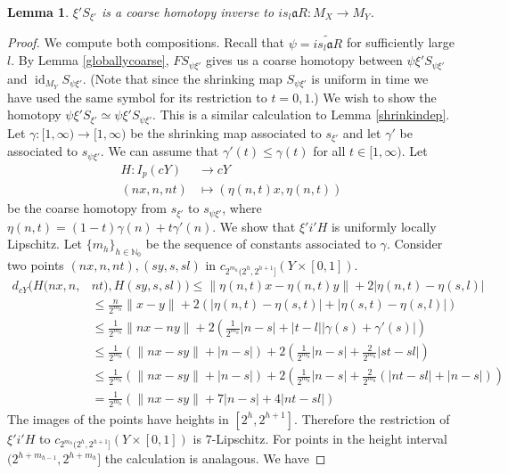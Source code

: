 \documentclass[a4paper,11pt]{article}
\theoremstyle{definition}
\theoremstyle{plain}
\newtheorem{lemma}[definition]{Lemma}
\theoremstyle{remark}
\DeclareMathOperator{\id}{id}
\begin{document}
{\begin{lemma} \label{che} $\xi' S_{\xi'}$ is a coarse homotopy inverse to $is_{l}\mathfrak{a}R: M_{X}\rightarrow M_{Y}$.  
\end{lemma}

\begin{proof} We compute both compositions. Recall that $\psi = \widetilde{is_{l}\mathfrak{a}R}$ for sufficiently large $l$. By Lemma \ref{globallycoarse}, $F S_{\psi \xi'}$ gives us a coarse homotopy between $\psi \xi' S_{\psi \xi'}$ and $\id_{M_{Y}}S_{\psi \xi'}$. (Note that since the shrinking map $S_{\psi \xi'}$ is uniform in time we have used the same symbol for its restriction to $t=0,1$.) We wish to show the homotopy $\psi \xi' S_{\xi'} \simeq \psi \xi' S_{\psi \xi'}$. This is a similar calculation to Lemma \ref{shrinkindep}. Let $\gamma: [1,\infty)\rightarrow [1,\infty)$ be the shrinking map associated to $s_{\xi'}$ and let $\gamma'$ be associated to $s_{\psi\xi'}$. We can assume that $\gamma'(t)\leq \gamma(t)$ for all $t\in [1,\infty)$. Let 
\begin{align*}
H: I_{p}(cY)&\rightarrow cY\\
(nx,n,nt)&\mapsto (\eta(n,t)x,\eta(n,t))
\end{align*}
be the coarse homotopy from $s_{\xi'}$ to $s_{\psi\xi'}$, where $\eta(n,t) = (1-t)\gamma(n)+t\gamma'(n)$.  We show that $\xi' i' H$ is uniformly locally Lipschitz. Let $\{m_{h}\}_{h\in \mathbb{N}_0}$ be the sequence of constants associated to $\gamma$. Consider two points $(nx,n,nt),(sy,s,sl)$ in $c_{2^{m_{h}}(2^{h},2^{h+1}]}(Y \times [0,1])$. 
\begin{align*}
d_{cY}(H(nx,n,&nt),H(sy,s,sl)) \leq \|\eta(n,t)x - \eta(n,t)y\| + 2|\eta(n,t)-\eta(s,l)|\\
&\leq \frac{n}{2^{m_{h}}} \|x-y\| + 2(|\eta(n,t)-\eta(s,t)|+|\eta(s,t)-\eta(s,l)|)\\
&\leq \frac{1}{2^{m_{h}}} \|nx-ny\|+2(\frac{1}{2^{m_{h}}}|n-s|+|t-l||\gamma(s)+\gamma'(s)|)\\
&\leq \frac{1}{2^{m_{h}}} (\|nx-sy\| + |n-s|) + 2(\frac{1}{2^{m_{h}}}|n-s| +\frac{2}{2^{m_{h}}}|st-sl|)\\
&\leq \frac{1}{2^{m_{h}}} (\|nx-sy\| + |n-s|) + 2(\frac{1}{2^{m_{h}}}|n-s| + \frac{2}{2^{m_{h}}}(|nt-sl|+|n-s|))\\
&= \frac{1}{2^{m_{h}}}(\|nx-sy\| + 7|n-s| + 4|nt-sl|)
\end{align*}
The images of the points have heights in $[2^h,2^{h+1}]$. Therefore the restriction of $\xi' i' H$ to $c_{2^{m_{h}}(2^{h},2^{h+1}]}(Y \times [0,1])$ is $7$-Lipschitz. For points in the height interval $(2^{h+m_{h-1}},2^{h+m_{h}}]$ the calculation is analagous. We have  

\end{proof}}
\end{document}
